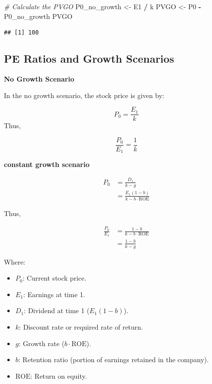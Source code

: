 \documentclass[
]{book}
\newenvironment{Shaded}{\begin{snugshade}}{\end{snugshade}}
\newcommand{\CommentTok}[1]{\textcolor[rgb]{0.56,0.35,0.01}{\textit{#1}}}
\newcommand{\NormalTok}[1]{#1}
\newcommand{\OtherTok}[1]{\textcolor[rgb]{0.56,0.35,0.01}{#1}}
\newcommand{\SpecialCharTok}[1]{\textcolor[rgb]{0.81,0.36,0.00}{\textbf{#1}}}
\providecommand{\tightlist}{%
  \setlength{\itemsep}{0pt}\setlength{\parskip}{0pt}}
\begin{document}
\begin{Shaded}
\begin{Highlighting}[]
\CommentTok{\# Calculate the PVGO}
\NormalTok{P0\_no\_growth }\OtherTok{\textless{}{-}}\NormalTok{ E1 }\SpecialCharTok{/}\NormalTok{ k}
\NormalTok{PVGO }\OtherTok{\textless{}{-}}\NormalTok{ P0 }\SpecialCharTok{{-}}\NormalTok{ P0\_no\_growth}
\NormalTok{PVGO}
\end{Highlighting}
\end{Shaded}

\begin{verbatim}
## [1] 100
\end{verbatim}

\hypertarget{pe-ratios-and-growth-scenarios}{%
\subsection{PE Ratios and Growth
Scenarios}\label{pe-ratios-and-growth-scenarios}}

\textbf{No Growth Scenario}

In the no growth scenario, the stock price is given by:

\[
P_0 = \frac{E_1}{k} 
\] Thus,

\[
\frac{P_0}{E_1} = \frac{1}{k}
\]

\textbf{constant growth scenario}

\[
\begin{aligned}
P_0 &= \frac{D_1}{k - g} \\
    &= \frac{E_1 (1 - b)}{k - b \cdot \text{ROE}}
\end{aligned}
\]

Thus,

\[
\begin{aligned}
\frac{P_0}{E_1} &= \frac{1 - b}{k - b \cdot \text{ROE}} \\
                &= \frac{1 - b}{k - g}
\end{aligned}
\]

Where:

\begin{itemize}
\tightlist
\item
  \(P_0\): Current stock price.
\item
  \(E_1\): Earnings at time 1.
\item
  \(D_1\): Dividend at time 1 (\(E_1 (1 - b)\)).
\item
  \(k\): Discount rate or required rate of return.
\item
  \(g\): Growth rate (\(b \cdot \text{ROE}\)).
\item
  \(b\): Retention ratio (portion of earnings retained in the company).
\item
  \(\text{ROE}\): Return on equity.
\end{itemize}
\end{document}
